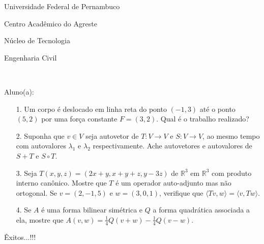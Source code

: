 \documentclass[oneside,a4paper,12pt]{article}
\newcommand{\universidade}{Universidade Federal de Pernambuco}
\newcommand{\centro}{Centro Acadêmico do Agreste}
\newcommand{\departamento}{Núcleo de Tecnologia}
\newcommand{\curso}{Engenharia Civil}
\begin{document}
     \begin{center}
     	\vspace{0pt}
     	
     	\universidade
     	\par
     	\centro
     	\par
     	\departamento
     	\par
     	\curso
     	\par
     	\vspace{08pt}
     	\\
     \end{center}
     
     \begin{flushleft}
     	Aluno(a):
     \end{flushleft}
 
 \begin{itemize}
 	\item[1.]  Um corpo é deslocado em linha reta do ponto $(-1,3)$ até o ponto $(5,2)$ por uma força constante $F=(3,2)$. Qual é o trabalho realizado?
 \end{itemize}
 \begin{itemize}
 	\item[2.] Suponha que $v\in V$ seja autovetor de $T:V\longrightarrow V$ e $S:V\longrightarrow V$, ao mesmo tempo com autovalores $\lambda_{1}$ e $\lambda_{2}$ respectivamente. Ache autovetores e autovalores de $S+T$ e $S\circ T$.
 \end{itemize}
 \begin{itemize}
 	\item [3.] Seja $T(x,y,z)=(2x+y,x+y+z,y-3z)$ de $\mathbb{R}^{3}$ em $\mathbb{R}^{3}$ com produto interno canônico. Mostre que $T$ é um operador auto-adjunto mas não ortogonal. Se $v=(2,-1,5)$ e $w=(3,0,1)$, verifique que $\langle Tv,w \rangle=\langle v,Tw \rangle$.
 \end{itemize}
 \begin{itemize}
 	\item[4.] Se $A$ é uma forma bilinear simétrica e $Q$ a forma quadrática associada a ela, mostre que $A(v,w)=\frac{1}{4}Q(v+w)-\frac{1}{4}Q(v-w)$.
 	
 \end{itemize}
 
\flushbottom
\flushright
Êxitos...!!!
\end{document}
